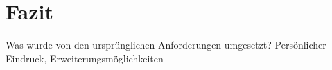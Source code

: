 
\chapter{Fazit}
Was wurde von den ursprünglichen Anforderungen umgesetzt? Persönlicher Eindruck, Erweiterungsmöglichkeiten